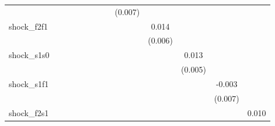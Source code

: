 {\begin{tabular}{l*{12}{c}}
            &                     &                     &                     &                     &                     &                     &                     &     (0.007)         &                     &                     &                     &                     \\
\addlinespace
shock\_f2f1  &                     &                     &                     &                     &                     &                     &                     &                     &       0.014\sym{**} &                     &                     &                     \\
            &                     &                     &                     &                     &                     &                     &                     &                     &     (0.006)         &                     &                     &                     \\
\addlinespace
shock\_s1s0  &                     &                     &                     &                     &                     &                     &                     &                     &                     &       0.013\sym{**} &                     &                     \\
            &                     &                     &                     &                     &                     &                     &                     &                     &                     &     (0.005)         &                     &                     \\
\addlinespace
shock\_s1f1  &                     &                     &                     &                     &                     &                     &                     &                     &                     &                     &      -0.003         &                     \\
            &                     &                     &                     &                     &                     &                     &                     &                     &                     &                     &     (0.007)         &                     \\
\addlinespace
shock\_f2s1  &                     &                     &                     &                     &                     &                     &                     &                     &                     &                     &                     &       0.010\sym{*}  \\

\end{tabular}}
